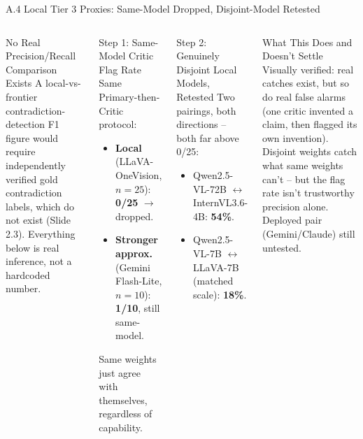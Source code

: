 \documentclass[aspectratio=169,11pt]{beamer}
\begin{document}
\begin{frame}{A.4 Local Tier 3 Proxies: Same-Model Dropped, Disjoint-Model Retested}
\scriptsize
\begin{columns}[T]
\begin{alertblock}{No Real Precision/Recall Comparison Exists}
\scriptsize A local-vs-frontier contradiction-detection F1 figure would require independently verified gold contradiction labels, which do not exist (Slide 2.3). Everything below is real inference, not a hardcoded number.
\end{alertblock}

\begin{block}{Step 1: Same-Model Critic Flag Rate}
\scriptsize Same Primary-then-Critic protocol:
\begin{itemize}
  \item \textbf{Local} (LLaVA-OneVision, $n=25$): \textbf{0/25} $\rightarrow$ dropped.
  \item \textbf{Stronger approx.} (Gemini Flash-Lite, $n=10$): \textbf{1/10}, still same-model.
\end{itemize}
Same weights just agree with themselves, regardless of capability.
\end{block}

\begin{block}{Step 2: Genuinely Disjoint Local Models, Retested}
\scriptsize Two pairings, both directions -- both far above 0/25:
\begin{itemize}
  \item Qwen2.5-VL-72B $\leftrightarrow$ InternVL3.6-4B: \textbf{54\%}.
  \item Qwen2.5-VL-7B $\leftrightarrow$ LLaVA-7B (matched scale): \textbf{18\%}.
\end{itemize}
\end{block}
\begin{block}{What This Does and Doesn't Settle}
\scriptsize Visually verified: real catches exist, but so do real false alarms (one critic invented a claim, then flagged its own invention). Disjoint weights catch what same weights can't -- but the flag rate isn't trustworthy precision alone. Deployed pair (Gemini/Claude) still untested.
\end{block}
\end{columns}
\end{frame}
\end{document}

